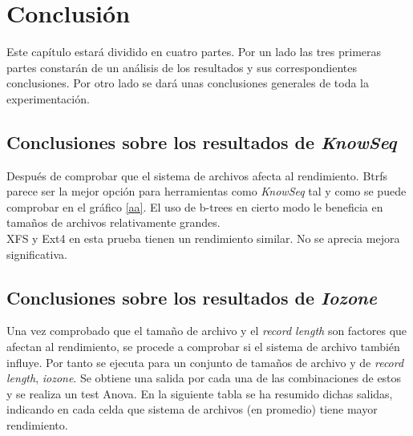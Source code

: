 

\cleardoublepage
\clearpage{}

\chapter[Conclusión]{Conclusión}
Este capítulo estará dividido en cuatro partes. Por un lado las tres primeras partes constarán de un análisis de los resultados y sus correspondientes conclusiones. Por otro lado se dará unas conclusiones generales de toda la experimentación.

\section{Conclusiones sobre los resultados de \textit{KnowSeq}}
Después de comprobar que el sistema de archivos afecta al rendimiento. Btrfs parece ser la mejor opción para herramientas como \textit{KnowSeq} tal y como se puede comprobar en el gráfico  \ref{aa}. El uso de b-trees en cierto modo le beneficia en tamaños de archivos relativamente grandes.\\

XFS y Ext4 en esta prueba tienen un rendimiento similar. No se aprecia mejora significativa.


\section{Conclusiones sobre los resultados de \textit{Iozone}}
Una vez comprobado que el tamaño de archivo y el \textit{record length} son factores que afectan al rendimiento, se procede a comprobar si el sistema de archivo también influye. Por tanto se ejecuta para un conjunto de tamaños de archivo y de \textit{record length}, \textit{iozone}. Se obtiene una salida por cada una de las combinaciones de estos y se realiza un test Anova. En la siguiente tabla se ha resumido dichas salidas, indicando en cada celda que sistema de archivos (en promedio) tiene mayor rendimiento.

